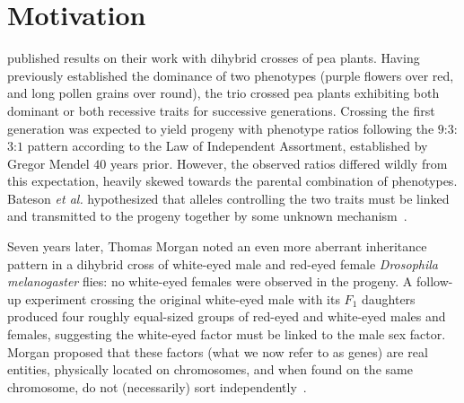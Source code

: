 \chapter{Motivation}
\label{ch:motivation}

 published results on their work with dihybrid crosses of pea plants.  Having previously established the dominance of two phenotypes (purple flowers over red, and long pollen grains over round), the trio crossed pea plants exhibiting both dominant or both recessive traits for successive generations.  Crossing the first generation was expected to yield progeny with phenotype ratios following the $9$:$3$:$3$:$1$ pattern according to the Law of Independent Assortment, established by Gregor Mendel $40$ years prior.  However, the observed ratios differed wildly from this expectation, heavily skewed towards the parental combination of phenotypes.  Bateson \textit{et al.} hypothesized that alleles controlling the two traits must be linked and transmitted to the progeny together by some unknown mechanism~\cite{Bateson:1908dq}.

Seven years later, Thomas Morgan noted an even more aberrant inheritance pattern in a dihybrid cross of white-eyed male and red-eyed female \textit{Drosophila melanogaster} flies: no white-eyed females were observed in the progeny.  A follow-up experiment crossing the original white-eyed male with its $F_{1}$ daughters produced four roughly equal-sized groups of red-eyed and white-eyed males and females, suggesting the white-eyed factor must be linked to the male sex factor.  Morgan proposed that these factors (what we now refer to as genes) are real entities, physically located on chromosomes, and when found on the same chromosome, do not (necessarily) sort independently~\cite{Morgan:1910hg}.


